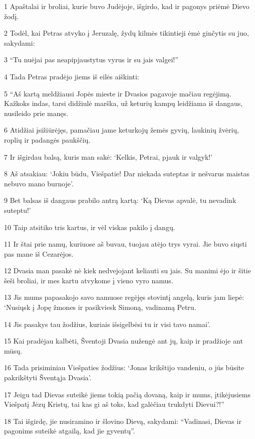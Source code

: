 \par 1 Apaštalai ir broliai, kurie buvo Judėjoje, išgirdo, kad ir pagonys priėmė Dievo žodį. 
\par 2 Todėl, kai Petras atvyko į Jeruzalę, žydų kilmės tikintieji ėmė ginčytis su juo, sakydami: 
\par 3 “Tu nuėjai pas neapipjaustytus vyrus ir su jais valgei!” 
\par 4 Tada Petras pradėjo jiems iš eilės aiškinti: 
\par 5 “Aš kartą meldžiausi Jopės mieste ir Dvasios pagavoje mačiau regėjimą. Kažkoks indas, tarsi didžiulė marška, už keturių kampų leidžiama iš dangaus, nusileido prie manęs. 
\par 6 Atidžiai įsižiūrėjęs, pamačiau jame keturkojų žemės gyvių, laukinių žvėrių, roplių ir padangės paukščių. 
\par 7 Ir išgirdau balsą, kuris man sakė: ‘Kelkis, Petrai, pjauk ir valgyk!’ 
\par 8 Aš atsakiau: ‘Jokiu būdu, Viešpatie! Dar niekada suteptas ir nešvarus maistas nebuvo mano burnoje’. 
\par 9 Bet balsas iš dangaus prabilo antrą kartą: ‘Ką Dievas apvalė, tu nevadink suteptu!’ 
\par 10 Taip atsitiko tris kartus, ir vėl viskas pakilo į dangų. 
\par 11 Ir štai prie namų, kuriuose aš buvau, tuojau atėjo trys vyrai. Jie buvo siųsti pas mane iš Cezarėjos. 
\par 12 Dvasia man pasakė nė kiek nedvejojant keliauti su jais. Su manimi ėjo ir šitie šeši broliai, ir mes kartu atvykome į vieno vyro namus. 
\par 13 Jis mums papasakojo savo namuose regėjęs stovintį angelą, kuris jam liepė: ‘Nusiųsk į Jopę žmones ir pasikviesk Simoną, vadinamą Petru. 
\par 14 Jis pasakys tau žodžius, kuriais išsigelbėsi tu ir visi tavo namai’. 
\par 15 Kai pradėjau kalbėti, Šventoji Dvasia nužengė ant jų, kaip ir pradžioje ant mūsų. 
\par 16 Tada prisiminiau Viešpaties žodžius: ‘Jonas krikštijo vandeniu, o jūs būsite pakrikštyti Šventąja Dvasia’. 
\par 17 Jeigu tad Dievas suteikė jiems tokią pačią dovaną, kaip ir mums, įtikėjusiems Viešpatį Jėzų Kristų, tai kas gi aš toks, kad galėčiau trukdyti Dievui?!” 
\par 18 Tai išgirdę, jie nusiramino ir šlovino Dievą, sakydami: “Vadinasi, Dievas ir pagonims suteikė atgailą, kad jie gyventų”. 
